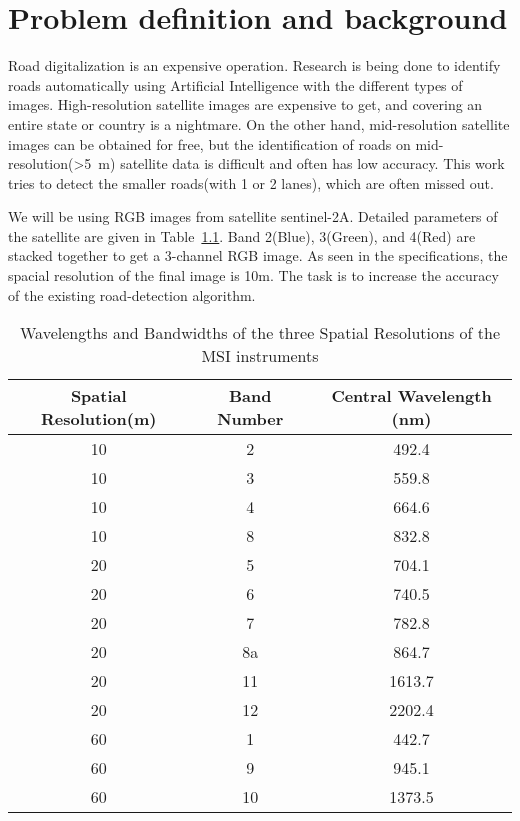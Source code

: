 \chapter{Problem definition and background}\label{chapt:problem}
Road digitalization is an expensive operation. Research is being done to identify roads automatically using Artificial Intelligence with the different types of images. High-resolution satellite images are expensive to get, and covering an entire state or country is a nightmare. On the other hand, mid-resolution satellite images can be obtained for free, but the identification of roads on mid-resolution(>5~m) satellite data is difficult and often has low accuracy. This work tries to detect the smaller roads(with 1 or 2 lanes), which are often missed out.

We will be using RGB images from satellite sentinel-2A. Detailed parameters of the satellite are given in Table~\ref{tab:sentinel-resolution}. Band 2(Blue), 3(Green), and 4(Red) are stacked together to get a 3-channel RGB image. As seen in the specifications, the spacial resolution of the final image is 10m. The task is to increase the accuracy of the existing road-detection algorithm.

\begin{table}[h!]
  \centering
  \begin{tabular}{ |c|c|c| }
    \hline
    Spatial Resolution(m) & Band Number & Central Wavelength (nm) \\
    \hline
    10&2&492.4 \\
    10&3&559.8 \\
    10&4&664.6 \\
    10&8&832.8 \\
    20&5&704.1 \\
    20&6&740.5 \\
    20&7&782.8 \\
    20&8a&864.7 \\
    20&11&1613.7 \\
    20&12&2202.4 \\
    60&1&442.7 \\
    60&9&945.1 \\
    60&10&1373.5 \\
    \hline
  \end{tabular}
  \caption{Wavelengths and Bandwidths of the three Spatial Resolutions of the MSI instruments \cite{sentinelSpecifications}}
  \label{tab:sentinel-resolution}
\end{table}

